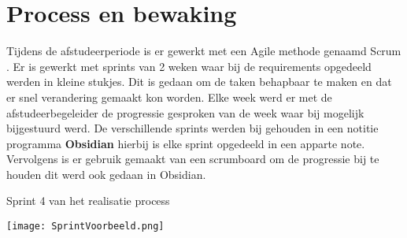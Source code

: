 \section{Process en bewaking}
Tijdens de afstudeerperiode is er gewerkt met een Agile \parencite{Agile} methode genaamd Scrum \Parencite{Scrum}.
Er is gewerkt met sprints van 2 weken waar bij de requirements opgedeeld werden in kleine stukjes.
Dit is gedaan om de taken behapbaar te maken en dat er snel verandering gemaakt kon worden.
Elke week werd er met de afstudeerbegeleider de progressie gesproken van de week waar bij mogelijk bijgestuurd werd.
De verschillende sprints werden bij gehouden in een notitie programma \textbf{Obsidian} hierbij is elke sprint opgedeeld in een apparte note.
Vervolgens is er gebruik gemaakt van een scrumboard om de progressie bij te houden dit werd ook gedaan in Obsidian.

\whitespace[2]
\begin{graphic}
	\captionsetup{type=figure}
	\caption{Sprint 4 van het realisatie process}
	\texttt{[image: SprintVoorbeeld.png]}
	\label{fig:VoorbeeldSprint}
\end{graphic}

